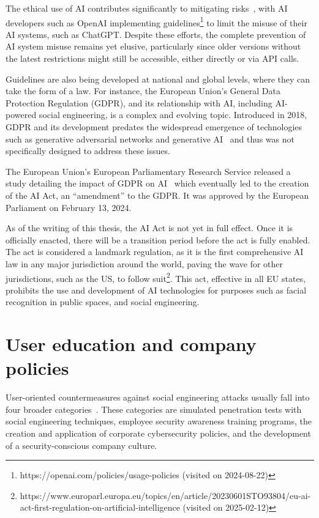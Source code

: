 The ethical use of AI contributes significantly to mitigating risks~\citep{gupta_From_ChatGPT_to_ThreatGPT_2023}, with AI developers such as OpenAI implementing guidelines\footnote{https://openai.com/policies/usage-policies (visited on 2024-08-22)} to limit the misuse of their AI systems, such as ChatGPT. Despite these efforts, the complete prevention of AI system misuse remains yet elusive, particularly since older versions without the latest restrictions might still be accessible, either directly or via API calls.

Guidelines are also being developed at national and global levels, where they can take the form of a law. For instance, the European Union's General Data Protection Regulation (GDPR), and its relationship with AI, including AI-powered social engineering, is a complex and evolving topic. Introduced in 2018, GDPR and its development predates the widespread emergence of technologies such as generative adversarial networks and generative AI~\citep{goodfellow_Generative_Adversarial_Networks_2020} and thus was not specifically designed to address these issues.

The European Union's European Parliamentary Research Service released a study detailing the impact of GDPR on AI~\citep{eprs_Impact_of_GDPR_on_AI_2020} which eventually led to the creation of the AI Act, an “amendment” to the GDPR. It was approved by the European Parliament on February 13, 2024. 

As of the writing of this thesis, the AI Act is not yet in full effect. Once it is officially enacted, there will be a transition period before the act is fully enabled. The act is considered a landmark regulation, as it is the first comprehensive AI law in any major jurisdiction around the world, paving the wave for other jurisdictions, such as the US, to follow suit\footnote{https://www.europarl.europa.eu/topics/en/article/20230601STO93804/eu-ai-act-first-regulation-on-artificial-intelligence (visited on 2025-02-12)}. This act, effective in all EU states, prohibits the use and development of AI technologies for purposes such as facial recognition in public spaces, and social engineering.



    


\section{User education and company policies}

User-oriented countermeasures against social engineering attacks usually fall into four broader categories~\citep{tsinganos_Towards_Automated_Recognition_Chat_SE_Enterprise_2018, mitnick_The_Art_of_Deception_2003}. These categories are simulated penetration tests with social engineering techniques, employee security awareness training programs, the creation and application of corporate cybersecurity policies, and the development of a security-conscious company culture.

